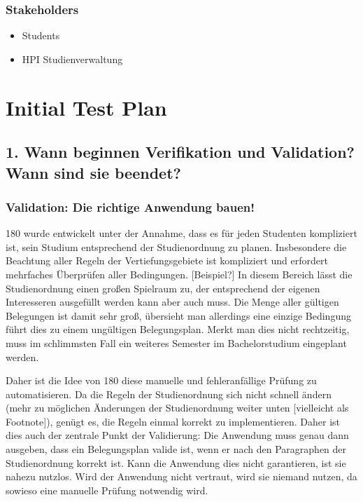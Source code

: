\documentclass[]{article}
\begin{document}
\subsubsection{Stakeholders}\label{stakeholders}

\begin{itemize}
\itemsep1pt\parskip0pt
\item
  Students
\item
  HPI Studienverwaltung
\end{itemize}

\section{Initial Test Plan}\label{initial-test-plan}

\subsection{1. Wann beginnen Verifikation und Validation? Wann sind sie
beendet?}\label{wann-beginnen-verifikation-und-validation-wann-sind-sie-beendet}

\subsubsection{Validation: Die richtige Anwendung
bauen!}\label{validation-die-richtige-anwendung-bauen}

180 wurde entwickelt unter der Annahme, dass es für jeden Studenten
kompliziert ist, sein Studium entsprechend der Studienordnung zu planen.
Insbesondere die Beachtung aller Regeln der Vertiefungsgebiete ist
kompliziert und erfordert mehrfaches Überprüfen aller Bedingungen.
{[}Beispiel?{]} In diesem Bereich lässt die Studienordnung einen großen
Spielraum zu, der entsprechend der eigenen Interesseren ausgefüllt
werden kann aber auch muss. Die Menge aller gültigen Belegungen ist
damit sehr groß, übersieht man allerdings eine einzige Bedingung führt
dies zu einem ungültigen Belegungsplan. Merkt man dies nicht
rechtzeitig, muss im schlimmsten Fall ein weiteres Semester im
Bachelorstudium eingeplant werden.

Daher ist die Idee von 180 diese manuelle und fehleranfällige Prüfung zu
automatisieren. Da die Regeln der Studienordnung sich nicht schnell
ändern (mehr zu möglichen Änderungen der Studienordnung weiter unten
{[}vielleicht als Footnote{]}), genügt es, die Regeln einmal korrekt zu
implementieren. Daher ist dies auch der zentrale Punkt der Validierung:
Die Anwendung muss genau dann ausgeben, dass ein Belegungsplan valide
ist, wenn er nach den Paragraphen der Studienordnung korrekt ist. Kann
die Anwendung dies nicht garantieren, ist sie nahezu nutzlos. Wird der
Anwendung nicht vertraut, wird sie niemand nutzen, da sowieso eine
manuelle Prüfung notwendig wird.
\end{document}
